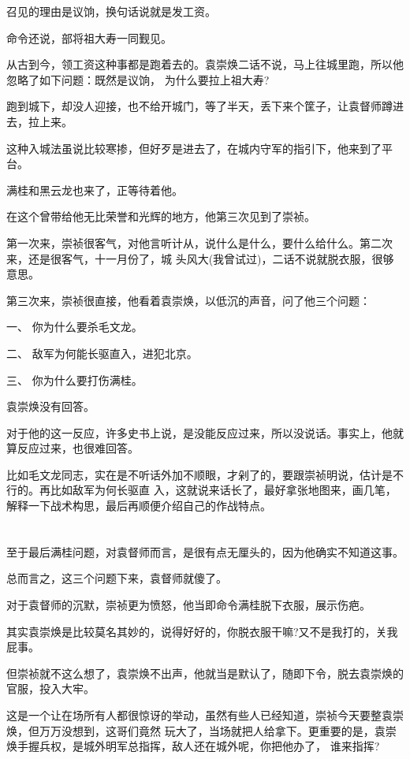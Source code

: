 \documentclass[11pt,a4paper,onecolumn]{article}
\begin{document}
召见的理由是议饷，换句话说就是发工资。

命令还说，部将祖大寿一同觐见。

从古到今，领工资这种事都是跑着去的。袁崇焕二话不说，马上往城里跑，所以他忽略了如下问题：既然是议饷，
为什么要拉上祖大寿?

跑到城下，却没人迎接，也不给开城门，等了半天，丢下来个筐子，让袁督师蹲进去，拉上来。

这种入城法虽说比较寒掺，但好歹是进去了，在城内守军的指引下，他来到了平台。

满桂和黑云龙也来了，正等待着他。

在这个曾带给他无比荣誉和光辉的地方，他第三次见到了崇祯。

第一次来，崇祯很客气，对他言听计从，说什么是什么，要什么给什么。第二次来，还是很客气，十一月份了，城
头风大(我曾试过)，二话不说就脱衣服，很够意思。

第三次来，崇祯很直接，他看着袁崇焕，以低沉的声音，问了他三个问题：

一、 你为什么要杀毛文龙。

二、 敌军为何能长驱直入，进犯北京。

三、 你为什么要打伤满桂。

袁崇焕没有回答。

对于他的这一反应，许多史书上说，是没能反应过来，所以没说话。事实上，他就算反应过来，也很难回答。

比如毛文龙同志，实在是不听话外加不顺眼，才剁了的，要跟崇祯明说，估计是不行的。再比如敌军为何长驱直
入，这就说来话长了，最好拿张地图来，画几笔，解释一下战术构思，最后再顺便介绍自己的作战特点。

\section[\thesection]{}

至于最后满桂问题，对袁督师而言，是很有点无厘头的，因为他确实不知道这事。

总而言之，这三个问题下来，袁督师就傻了。

对于袁督师的沉默，崇祯更为愤怒，他当即命令满桂脱下衣服，展示伤疤。

其实袁崇焕是比较莫名其妙的，说得好好的，你脱衣服干嘛?又不是我打的，关我屁事。

但崇祯就不这么想了，袁崇焕不出声，他就当是默认了，随即下令，脱去袁崇焕的官服，投入大牢。

这是一个让在场所有人都很惊讶的举动，虽然有些人已经知道，崇祯今天要整袁崇焕，但万万没想到，这哥们竟然
玩大了，当场就把人给拿下。更重要的是，袁崇焕手握兵权，是城外明军总指挥，敌人还在城外呢，你把他办了，
谁来指挥?
\end{document}
